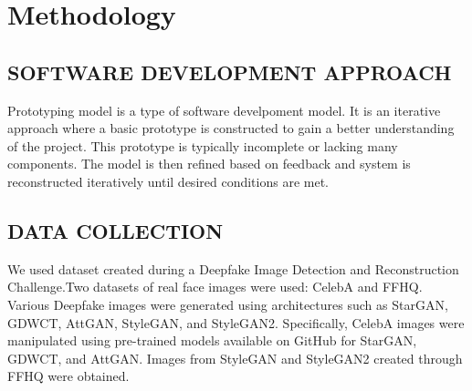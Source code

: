     \chapter{Methodology}
       \section{SOFTWARE DEVELOPMENT APPROACH}
        Prototyping model is a type of software develpoment model. It is an iterative approach where a basic prototype is constructed to gain a better understanding of the project. This prototype is typically incomplete or lacking many components. The model is then refined based on feedback and system is reconstructed iteratively until desired conditions are met.
         \begin{figure}[hbt!]
        \end{figure}
        \section{DATA COLLECTION}
        We used dataset created during a Deepfake Image Detection and Reconstruction Challenge.Two datasets of real face images were used: CelebA and FFHQ. Various Deepfake images were generated using architectures such as StarGAN, GDWCT, AttGAN, StyleGAN, and StyleGAN2. Specifically, CelebA images were manipulated using pre-trained models available on GitHub for StarGAN, GDWCT, and AttGAN. Images from StyleGAN and StyleGAN2 created through FFHQ were obtained.
        
